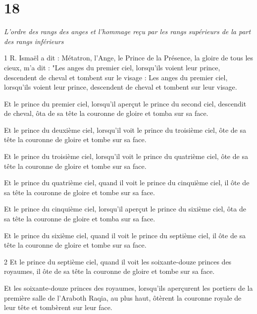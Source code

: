 \chapter{18}

\par \textit{L'ordre des rangs des anges et l'hommage reçu par les rangs supérieurs de la part des rangs inférieurs}

\par 1 R. Ismaël a dit : Métatron, l'Ange, le Prince de la Présence, la gloire de tous les cieux, m'a dit : "Les anges du premier ciel, lorsqu'ils voient leur prince, descendent de cheval et tombent sur le visage : Les anges du premier ciel, lorsqu'ils voient leur prince, descendent de cheval et tombent sur leur visage.

\par Et le prince du premier ciel, lorsqu'il aperçut le prince du second ciel, descendit de cheval, ôta de sa tête la couronne de gloire et tomba sur sa face.

\par Et le prince du deuxième ciel, lorsqu'il voit le prince du troisième ciel, ôte de sa tête la couronne de gloire et tombe sur sa face.

\par Et le prince du troisième ciel, lorsqu'il voit le prince du quatrième ciel, ôte de sa tête la couronne de gloire et tombe sur sa face.

\par Et le prince du quatrième ciel, quand il voit le prince du cinquième ciel, il ôte de sa tête la couronne de gloire et tombe sur sa face.

\par Et le prince du cinquième ciel, lorsqu'il aperçut le prince du sixième ciel, ôta de sa tête la couronne de gloire et tomba sur sa face.

\par Et le prince du sixième ciel, quand il voit le prince du septième ciel, il ôte de sa tête la couronne de gloire et tombe sur sa face.

\par 2 Et le prince du septième ciel, quand il voit les soixante-douze princes des royaumes, il ôte de sa tête la couronne de gloire et tombe sur sa face.

\par Et les soixante-douze princes des royaumes, lorsqu'ils aperçurent les portiers de la première salle de l'Araboth Raqia, au plus haut, ôtèrent la couronne royale de leur tête et tombèrent sur leur face.

